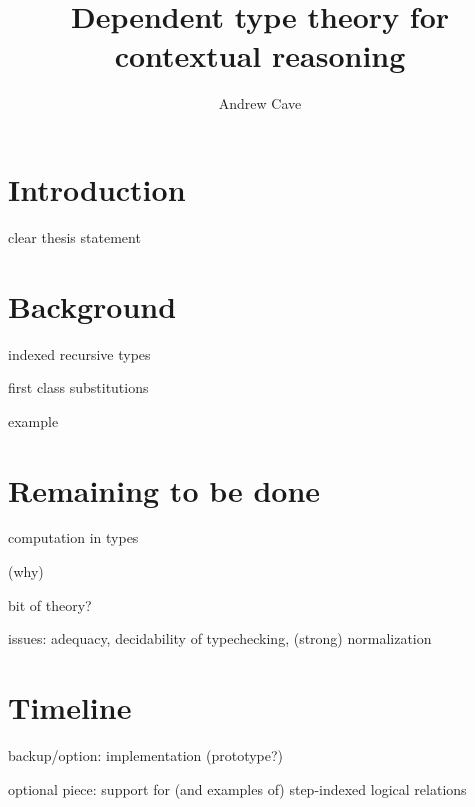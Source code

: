 \documentclass{article}
\author{Andrew Cave}
\title{Dependent type theory for contextual reasoning}
\begin{document}
\maketitle

\section{Introduction}
clear thesis statement
\section{Background}
indexed recursive types

first class substitutions

example
\section{Remaining to be done}
computation in types

(why)

bit of theory?

issues: adequacy, decidability of typechecking, (strong) normalization
\section{Timeline}
backup/option: implementation (prototype?)

optional piece: support for (and examples of) step-indexed logical relations
\end{document}
